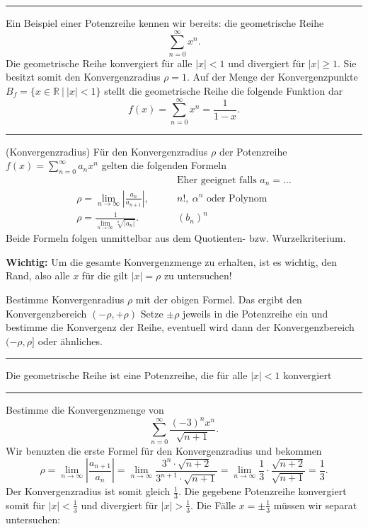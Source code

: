 \documentclass[a4paper,landscape,8pt]{extarticle}
\newcommand{\R}{\mathbb{R}}
\newcommand{\abs}[1]{\left\lvert #1 \right\rvert}
\newcommand{\setsep}{\ \vert \ }
\newcommand{\sep}{\vspace{5pt}\noindent\hrule\vspace{5pt}}
\newcommand{\Wichtig}{\textbf{Wichtig: }}
\begin{document}
\begin{multicols*}{4}
\begin{warmup}
\sep

\Bsp Ein Beispiel einer Potenzreihe kennen wir bereits: die geometrische Reihe
\[
\sum_{n=0}^{\infty} x^n.
\]
Die geometrische Reihe konvergiert für alle $\abs{x}<1$ und divergiert für
$\abs{x}\geq 1$. Sie besitzt somit den Konvergenzradius $\rho = 1$. Auf der
Menge der Konvergenzpunkte $B_f = \{x\in\R \setsep \abs{x}<1\}$ stellt die
geometrische Reihe die folgende Funktion dar
\[
f(x)=\sum_{n=0}^{\infty}x^n = \frac{1}{1-x}.
\]

\end{warmup}

\sep

\Satz (Konvergenzradius) Für den Konvergenzradius $\rho$ der Potenzreihe
$f(x)=\sum_{n=0}^\infty a_nx^n$ gelten die folgenden Formeln
\begin{align*}
& \qquad \text{Eher geeignet falls }a_n=\ldots\\
\rho = \lim_{n\to\infty} \abs{\frac{a_n}{a_{n+1}}}, &\qquad n!, \ \alpha^{n}
\text{ oder Polynom}\\
\rho = \frac{1}{\lim_{n\to\infty}\sqrt[n]{\abs{a_n}}}. &\qquad(b_n)^n
\end{align*}
Beide Formeln folgen unmittelbar aus dem Quotienten- bzw. Wurzelkriterium.

\begin{warmup}
\Wichtig Um die gesamte Konvergenzmenge zu erhalten, ist es wichtig, den Rand,
also alle $x$ für die gilt $\abs{x}=\rho$ zu untersuchen!

\Vorgehen Bestimme Konvergenradius $\rho$ mit der obigen Formel. Das ergibt den
Konvergenzbereich $(-\rho,+\rho)$ Setze $\pm\rho$ jeweils in die Potenzreihe ein
und bestimme die Konvergenz der Reihe, eventuell wird dann der Konvergenzbereich
$(-\rho,\rho]$ oder ähnliches.

\end{warmup}

\sep

\Bsp Die geometrische Reihe ist eine Potenzreihe, die für alle $\abs{x}<1$
konvergiert

\begin{warmup}
\sep

\Bsp Bestimme die Konvergenzmenge von
\[
\sum_{n=0}^\infty \frac{(-3)^nx^n}{\sqrt{n+1}}.
\]
Wir benuzten die erste Formel für den Konvergenzradius und bekommen
\[
\rho =
\lim_{n\to\infty}\abs{\frac{a_{n+1}}{a_n}}
=\lim_{n\to\infty}\frac{3^n\cdot\sqrt{n+2}}{3^{n+1}\cdot\sqrt{n+1}}
= \lim_{n\to\infty}\frac{1}{3}\cdot\frac{\sqrt{n+2}}{\sqrt{n+1}}=\frac{1}{3}.
\]
Der Konvergenzradius ist somit gleich $\frac{1}{3}$. Die gegebene Potenzreihe
konvergiert somit für $\abs{x}<\frac{1}{3}$ und divergiert für
$\abs{x}>\frac{1}{3}$. Die Fälle $x=\pm \frac{1}{3}$ müssen wir separat
untersuchen:


\end{warmup}
\end{multicols*}
\end{document}
